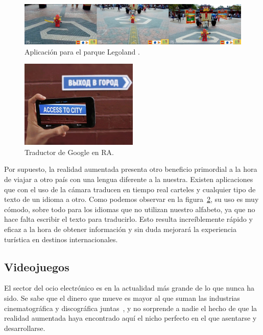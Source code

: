 \begin{figure}[H]
     \centering
     \includegraphics[width=\textwidth]{Images/Lego_Park.png}
     \caption[Aplicación para el parque Legoland]{Aplicación para el parque Legoland \footnotemark.}
     \label{fig:googletranslate}
 \end{figure}


\begin{figure}
    \centering
    \includegraphics[width=0.5\textwidth]{Images/google-translate.jpg}
    \caption[Traductor de Google en RA]{Traductor de Google en RA\footnotemark.}
    \label{fig:googletranslate}
\end{figure}
 

Por supuesto, la realidad aumentada presenta otro beneficio primordial a la hora de viajar a otro país con una lengua diferente a la nuestra. Existen aplicaciones que con el uso de la cámara traducen en tiempo real carteles y cualquier tipo de texto de un idioma a otro. Como podemos observar en la figura~\ref{fig:googletranslate}, su uso es muy cómodo, sobre todo para los idiomas que no utilizan nuestro alfabeto, ya que no hace falta escribir el texto para traducirlo. Esto resulta increíblemente rápido y eficaz a la hora de obtener información y sin duda mejorará la experiencia turística en destinos internacionales.

  


\subsection{Videojuegos}
El sector del ocio electrónico es en la actualidad más grande de lo que nunca ha sido. Se sabe que el dinero que mueve es mayor al que suman las industrias cinematográfica y discográfica juntas~\cite{libroblanco}, y no sorprende a nadie el hecho de que la realidad aumentada haya encontrado aquí el nicho perfecto en el que asentarse y desarrollarse.\\

